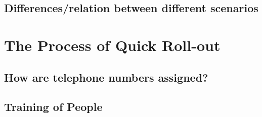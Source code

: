 \subsection{Differences/relation between different scenarios}




\section{The Process of Quick Roll-out}

\subsection{How are telephone numbers assigned?}

\subsection{Training of People}
